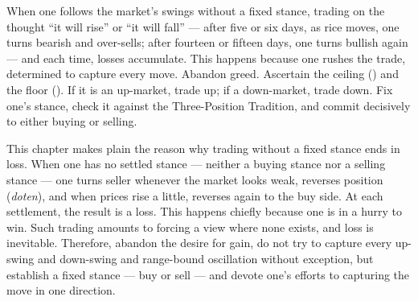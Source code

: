 
\begin{sokyubox}
{\small\itshape\color{sokyubar} }

\medskip
When one follows the market's swings without a fixed stance, trading on
the thought ``it will rise'' or ``it will fall'' --- after five or six
days, as rice moves, one turns bearish and over-sells; after fourteen or
fifteen days, one turns bullish again --- and each time, losses
accumulate. This happens because one rushes the trade, determined to
capture every move. Abandon greed. Ascertain the ceiling
() and the floor (). If it is an
up-market, trade up; if a down-market, trade down. Fix one's stance,
check it against the Three-Position Tradition, and commit decisively to
either buying or selling.
\end{sokyubox}

\commentary
This chapter makes plain the reason why trading without a fixed stance
ends in loss. When one has no settled stance --- neither a buying stance
nor a selling stance --- one turns seller whenever the market looks weak,
reverses position (\textit{doten}), and when prices rise a little,
reverses again to the buy side. At each settlement, the result is a loss.
This happens chiefly because one is in a hurry to win. Such trading
amounts to forcing a view where none exists, and loss is inevitable.
Therefore, abandon the desire for gain, do not try to capture every
up-swing and down-swing and range-bound oscillation without exception,
but establish a fixed stance --- buy or sell --- and devote one's efforts
to capturing the move in one direction.


